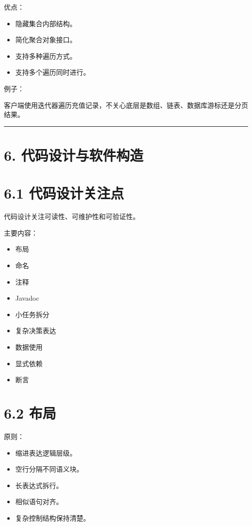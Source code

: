 \documentclass[UTF8,zihao=-4]{ctexart}
\begin{document}
优点：

\begin{itemize}
\item 隐藏集合内部结构。
\item 简化聚合对象接口。
\item 支持多种遍历方式。
\item 支持多个遍历同时进行。
\end{itemize}

例子：

客户端使用迭代器遍历充值记录，不关心底层是数组、链表、数据库游标还是分页结果。

\bigskip\hrule\bigskip

\section{6. 代码设计与软件构造}

\section{6.1 代码设计关注点}

代码设计关注可读性、可维护性和可验证性。

主要内容：

\begin{itemize}
\item 布局
\item 命名
\item 注释
\item Javadoc
\item 小任务拆分
\item 复杂决策表达
\item 数据使用
\item 显式依赖
\item 断言
\end{itemize}

\section{6.2 布局}

原则：

\begin{itemize}
\item 缩进表达逻辑层级。
\item 空行分隔不同语义块。
\item 长表达式拆行。
\item 相似语句对齐。
\item 复杂控制结构保持清楚。
\end{itemize}
\end{document}
